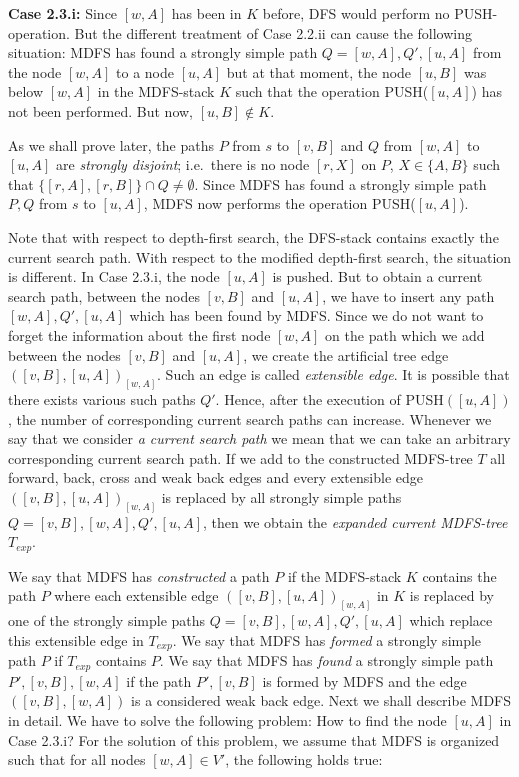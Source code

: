 \documentclass[12pt,twoside,a4paper]{article}
\begin{document}
\medskip
\noindent
{\bf Case 2.3.i:} Since $[w,A]$ has been in $K$ before, DFS would perform no 
PUSH-operation. But the different treatment of Case 2.2.ii can cause the
following situation: 
MDFS has found a strongly simple path $Q = [w,A],Q',[u,A]$ from the node $[w,A]$
to a node $[u,A]$ but at that moment, the node $[u,B]$ was below $[w,A]$ in the MDFS-stack
$K$ such that the operation PUSH($[u,A]$) has not been performed. But now, 
$[u,B]\not\in K$.

As we shall prove later, the paths $P$ from $s$ to $[v,B]$ and $Q$ from
$[w,A]$ to $[u,A]$ are {\em strongly disjoint\/}; i.e.\ there is no node $[r,X]$
on $P$, $X \in \{A,B\}$ such that $\{[r,A],[r,B]\} \cap Q \not= \emptyset$. 
Since MDFS has found a strongly simple path $P,Q$ from $s$ to $[u,A]$, MDFS now performs 
the operation PUSH($[u,A]$).

\medskip
Note that with respect to depth-first search, the DFS-stack contains exactly
the current search path. With respect to the modified depth-first search,
the situation is different. In Case 2.3.i, the node $[u,A]$ is pushed. But
to obtain a current search path, between the nodes $[v,B]$ and $[u,A]$,
we have to insert any path $[w,A],Q',[u,A]$ which has been found by MDFS.
Since we do not want to forget the information about the first node $[w,A]$
on the path which we add between the nodes $[v,B]$ and $[u,A]$, we 
create the artificial tree edge $([v,B],[u,A])_{[w,A]}$. Such an edge is
called {\em extensible edge}. It is possible that there exists various such
paths $Q'$. Hence, after the execution of PUSH$([u,A])$, the number of
corresponding current search paths can increase. 
Whenever we say that we consider {\em a current search path\/} we mean that we can
take an arbitrary corresponding current search path. If we add to the
constructed MDFS-tree $T$ all forward, back, cross and weak back edges and  
every extensible edge $([v,B],[u,A])_{[w,A]}$ is replaced by all strongly simple 
paths $Q = [v,B],[w,A],Q',[u,A]$, then
we obtain the {\em expanded current MDFS-tree\/} $T_{exp}$.

We say that MDFS has {\em constructed\/} a path $P$ if the MDFS-stack $K$ contains the 
path $P$ where each extensible edge $([v,B],[u,A])_{[w,A]}$ in $K$ is replaced by one
of the strongly simple paths $Q = [v,B],[w,A],Q',[u,A]$ which replace this extensible
edge in $T_{exp}$. 
We say that MDFS has {\em formed\/} a strongly simple path $P$ if $T_{exp}$ contains 
$P$. We say that MDFS has {\em found\/} a strongly simple path $P',[v,B],[w,A]$ if 
the path $P',[v,B]$ is formed by MDFS and the edge $([v,B],[w,A])$ is a considered 
weak back edge.
Next we shall describe MDFS in detail. 
We have to solve the following
problem: How to find the node $[u,A]$ in Case 2.3.i?
For the solution of this problem, we assume that MDFS is organized such that 
for all nodes $[w,A]\in V'$, the following holds true:
\end{document}

